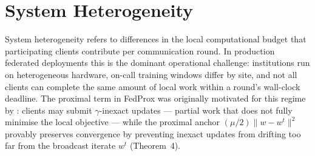 %
%
%
%
%
%   

\section{System Heterogeneity}
\label{sec:results-system-het}

System heterogeneity refers to differences in the local computational
budget that participating clients contribute per communication round.
In production federated deployments this is the dominant operational
challenge: institutions run on heterogeneous hardware, on-call training
windows differ by site, and not all clients can complete the same
amount of local work within a round's wall-clock deadline. The proximal
term in FedProx was originally motivated for this regime by
\citet{li2020fedprox}: clients may submit $\gamma$-inexact updates ---
partial work that does not fully minimise the local objective --- while
the proximal anchor $(\mu/2)\lVert w - w^t \rVert^2$ provably preserves
convergence by preventing inexact updates from drifting too far from
the broadcast iterate $w^t$ (Theorem~4).

